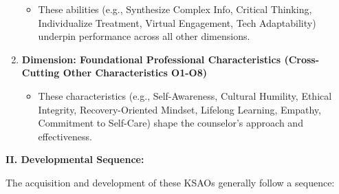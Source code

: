 \documentclass[
  letterpaper,
  DIV=11,
  numbers=noendperiod]{scrartcl}
\providecommand{\tightlist}{%
  \setlength{\itemsep}{0pt}\setlength{\parskip}{0pt}}
\begin{document}
\begin{enumerate}
  \begin{itemize}
  \tightlist
  \item
    These abilities (e.g., Synthesize Complex Info, Critical Thinking,
    Individualize Treatment, Virtual Engagement, Tech Adaptability)
    underpin performance across all other dimensions.
  \end{itemize}
\item
  \textbf{Dimension: Foundational Professional Characteristics
  (Cross-Cutting Other Characteristics O1-O8)}

  \begin{itemize}
  \tightlist
  \item
    These characteristics (e.g., Self-Awareness, Cultural Humility,
    Ethical Integrity, Recovery-Oriented Mindset, Lifelong Learning,
    Empathy, Commitment to Self-Care) shape the counselor's approach and
    effectiveness.
  \end{itemize}
\end{enumerate}

\textbf{II. Developmental Sequence:}

The acquisition and development of these KSAOs generally follow a
sequence:
\end{document}
